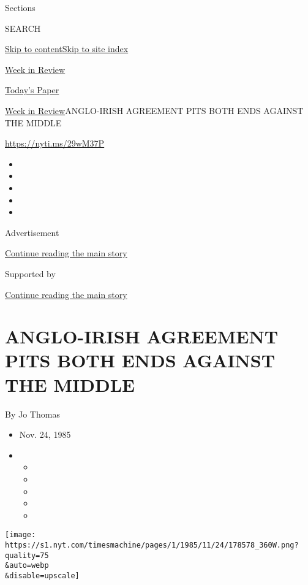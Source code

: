 Sections

SEARCH

\protect\hyperlink{site-content}{Skip to
content}\protect\hyperlink{site-index}{Skip to site index}

\href{https://www.nytimes.com/pages/weekinreview/index.html}{Week in
Review}

\href{https://myaccount.nytimes.com/auth/login?response_type=cookie\&client_id=vi}{}

\href{https://www.nytimes.com/section/todayspaper}{Today's Paper}

\href{/pages/weekinreview/index.html}{Week in
Review}\textbar{}ANGLO-IRISH AGREEMENT PITS BOTH ENDS AGAINST THE MIDDLE

\url{https://nyti.ms/29wM37P}

\begin{itemize}
\item
\item
\item
\item
\item
\end{itemize}

Advertisement

\protect\hyperlink{after-top}{Continue reading the main story}

Supported by

\protect\hyperlink{after-sponsor}{Continue reading the main story}

\hypertarget{anglo-irish-agreement-pits-both-ends-against-the-middle}{%
\section{ANGLO-IRISH AGREEMENT PITS BOTH ENDS AGAINST THE
MIDDLE}\label{anglo-irish-agreement-pits-both-ends-against-the-middle}}

By Jo Thomas

\begin{itemize}
\item
  Nov. 24, 1985
\item
  \begin{itemize}
  \item
  \item
  \item
  \item
  \item
  \end{itemize}
\end{itemize}

\texttt{[image: https://s1.nyt.com/timesmachine/pages/1/1985/11/24/178578\_360W.png?quality=75\\\&auto=webp\\\&disable=upscale]}

